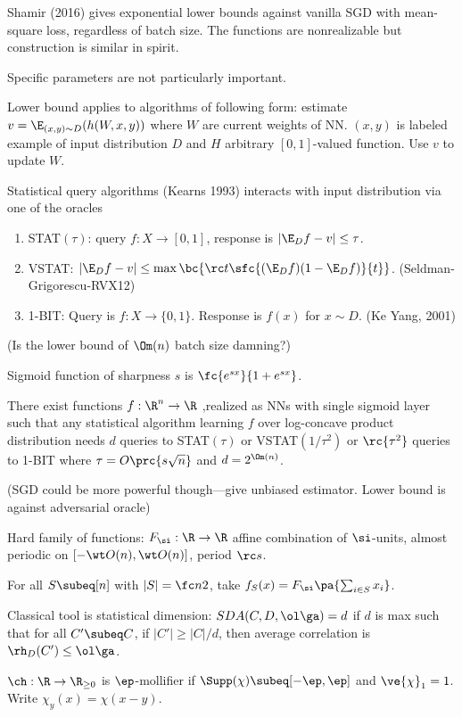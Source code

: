 Shamir (2016) gives exponential lower bounds against vanilla SGD with mean-square loss, regardless of batch size. The functions are nonrealizable but construction is similar in spirit.

Specific parameters are not particularly important.

Lower bound applies to algorithms of following form: estimate $v=\E_{(x,y)\sim D} (h(W,x,y))$ where $W$ are current weights of NN. $(x,y)$  is labeled example of input distribution $D$ and $H$ arbitrary $[0,1]$-valued function. Use $v$ to update $W$.

Statistical query algorithms  (Kearns 1993) interacts with input distribution via one of the oracles
\begin{enumerate}
\item
STAT$(\tau)$: query $f:X\to [0,1]$, response is $|\E_D f-v|\le \tau$.
\item
VSTAT: $|\E_D f-v|\le \max\bc{\rc t \sfc{(\E_D f)(1-\E_Df)}{t}}$. (Seldman-Grigorescu-RVX12)
\item
1-BIT: Query is $f:X\to \{0,1\}$. 
Response is $f(x)$ for $x\sim D$. (Ke Yang, 2001)
\end{enumerate}

(Is the lower bound of $\Om(n)$ batch size damning?)

Sigmoid function of sharpness $s$ is $\fc{e^{sx}}{1+e^{sx}}$. 
\begin{thm}
There exist functions $f:\R^n\to \R$ ,realized as NNs with single %
sigmoid layer such that any statistical algorithm learning $f$ over log-concave product distribution needs $d$ queries to STAT$(\tau)$ or VSTAT$(1/\tau^2)$ or $\rc{\tau^2}$ queries to 1-BIT where $\tau = O\prc{s\sqrt n}$ and $d=2^{\Om(n)}$. 
\end{thm}
(SGD could be more powerful though---give unbiased estimator. Lower bound is against adversarial oracle)

Hard family of functions: $F_\si: \R\to \R$ affine combination of $\si$-units, almost periodic on $[-\wt O(n), \wt O(n)]$, period $\rc s$.

For all $S\subeq [n]$ with $|S|=\fc n2$, take $f_S(x) = F_\si\pa{\sum_{i\in S}x_i}$. 

Classical tool is statistical dimension: $SDA(C,D,\ol \ga)=d$ if $d$ is max such that for all $C'\subeq C$, if $|C'|\ge |C|/d$, then average correlation is $\rh_D(C')\le \ol \ga$.

$\ch:\R\to \R_{\ge0}$ is $\ep$-mollifier if $\Supp(\chi)\subeq [-\ep,\ep]$ and $\ve{\chi}_1=1$. Write $\chi_y(x) = \chi(x-y)$. 

